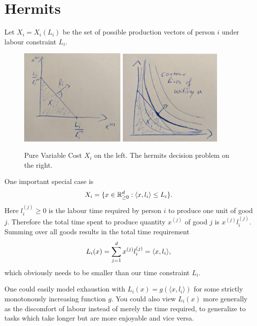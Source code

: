 \section{Hermits}

Let \(X_i = X_i(L_i)\) be the set of possible production vectors of person \(i\)
under labour constraint \(L_i\).

\begin{figure}
	\centering
	\includegraphics[width=0.46\textwidth]{images/pure-variable-cost.jpeg}
	\includegraphics[width=0.45\textwidth]{images/hermit-decision-pure-variable.jpeg}
	\caption{
		Pure Variable Cost \(X_i\) on the left. The hermits decision problem
		on the right.
	}
\end{figure}
\begin{example*}
	One important special case is
	\[
		X_i = \{ x \in \mathbb{R}_{\ge 0}^d: \langle x, l_i \rangle \le L_i \}.
	\]
	Here \(l_i^{(j)}\ge0\) is the labour time required by person \(i\) to produce one
	unit of good \(j\). Therefore the total time spent to produce quantity
	\(x^{(j)}\) of good \(j\) is \(x^{(j)}l_i^{(j)}\). Summing over all goods
	results in the total time requirement
	\[
		L_i(x) = \sum_{j=1}^d x^{(j)}l_i^{(j)} = \langle x, l_i\rangle,
	\]
	which obviously needs to be smaller than our time constraint \(L_i\).

	One could easily model exhaustion with \(L_i(x) = g(\langle x, l_i\rangle)\)
	for some strictly monotonously increasing function \(g\). You could also
	view \(L_i(x)\) more generally as the discomfort of labour instead of merely
	the time required, to generalize to tasks which take longer but are more
	enjoyable and vice versa.
\end{example*}


